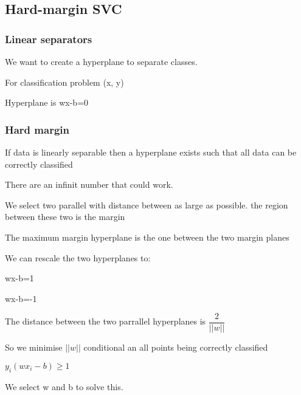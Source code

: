 
\subsection{Hard-margin SVC}

\subsubsection{Linear separators}

We want to create a hyperplane to separate classes.

For classification problem (x, y)

Hyperplane is wx-b=0

\subsubsection{Hard margin}

If data is linearly separable then a hyperplane exists such that all data can be correctly classified

There are an infinit number that could work.

We select two parallel with distance between as large as possible. the region between these two is the margin

The maximum margin hyperplane is the one between the two margin planes

We can rescale the two hyperplanes to:

wx-b=1

wx-b=-1

The distance between the two parrallel hyperplanes is \(\dfrac{2}{||w||}\)

So we minimise \(||w||\) conditional an all points being correctly classified

\(y_i(wx_i-b)\ge 1\)

We select w and b to solve this.



